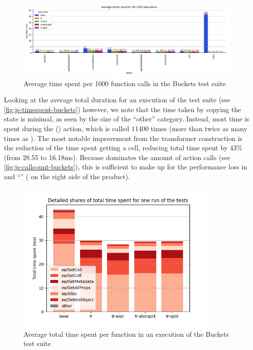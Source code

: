 \begin{figure}
	\centering
	\includegraphics[width=\textwidth]{figures/js-avgtime-buckets.png}
	\caption{Average time spent per 1000 function calls in the Buckets test suite}
	\label{fig:js-avgtime-buckets}
\end{figure}

Looking at the average total duration for an execution of the test suite (see \autoref{fig:js-timespent-buckets}) however, we note that the time taken by copying the state is minimal, as seen by the size of the ``other'' category. Instead, most time is spent during the \load{} () action, which is called 11400 times (more than twice as many times as \store{}). The most notable improvement from the transformer construction is the reduction of the time spent getting a cell, reducing total time spent by 43\% (from 28.55 to 16.18ms). Because \load{} dominates the amount of action calls (see \autoref{fig:js-callcount-buckets}), this is sufficient to make up for the performance loss in \store{} and ``'' (\load{} on the right side of the product).

\begin{figure}
	\centering
	\includegraphics[width=10cm]{figures/js-timespent-buckets.png}
	\caption{Average total time spent per function in an execution of the Buckets test suite}
	\label{fig:js-timespent-buckets}
\end{figure}


